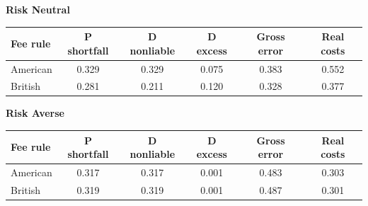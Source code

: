 \documentclass[10pt,border=5pt,varwidth=17cm]{standalone}
\begin{document}
\begingroup
\small
\setlength{\tabcolsep}{5pt}
\renewcommand{\arraystretch}{1.20}
\noindent\textbf{Risk Neutral}\par\smallskip
\noindent\begin{tabularx}{\linewidth}{@{}>{\raggedright\arraybackslash}Xccccc@{}}
\toprule
\textbf{Fee rule} & \textbf{P shortfall} & \textbf{D nonliable} & \textbf{D excess} & \textbf{Gross error} & \textbf{Real costs} \\
\midrule
American & 0.329 & 0.329 & 0.075 & 0.383 & 0.552 \\
British & 0.281 & 0.211 & 0.120 & 0.328 & 0.377 \\
\bottomrule\end{tabularx}\par\medskip
\noindent\textbf{Risk Averse}\par\smallskip
\noindent\begin{tabularx}{\linewidth}{@{}>{\raggedright\arraybackslash}Xccccc@{}}
\toprule
\textbf{Fee rule} & \textbf{P shortfall} & \textbf{D nonliable} & \textbf{D excess} & \textbf{Gross error} & \textbf{Real costs} \\
\midrule
American & 0.317 & 0.317 & 0.001 & 0.483 & 0.303 \\
British & 0.319 & 0.319 & 0.001 & 0.487 & 0.301 \\
\bottomrule\end{tabularx}\par\medskip
\endgroup
\end{document}
